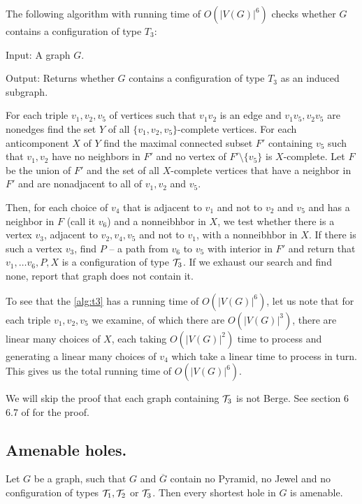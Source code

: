 The following algorithm with running time of $O(|V(G)|^6)$ checks whether $G$ contains a configuration of type $T_3$:

\begin{alg}
	\label{alg:t3}
	Input: A graph $G$.

	\noindent Output: Returns whether $G$ contains a configuration of type $T_3$ as an induced subgraph.
\end{alg}
\begin{algtext2}

	For each triple $v_1, v_2, v_5$ of vertices such that $v_1v_2$ is an edge and $v_1v_5, v_2v_5$ are nonedges find the set $Y$ of all $\{v_1, v_2, v_5\}$-complete vertices. For each anticomponent $X$ of $Y$ find the maximal connected subset $F'$ containing $v_5$ such that $v_1, v_2$ have no neighbors in $F'$ and no vertex of $F'\setminus\{v_5\}$ is $X$-complete. Let $F$ be the union of $F'$ and the set of all $X$-complete vertices that have a neighbor in $F'$ and are nonadjacent to all of $v_1, v_2$ and $v_5$.

	Then, for each choice of $v_4$ that is adjacent to $v_1$ and not to $v_2$ and $v_5$ and has a neighbor in $F$ (call it $v_6$) and a nonneibhbor in $X$, we test whether there is a vertex $v_3$, adjacent to $v_2, v_4, v_5$ and not to $v_1$, with a nonneibhbor in $X$. If there is such a vertex $v_3$, find $P$ -- a path from $v_6$ to $v_5$ with interior in $F'$ and return that $v_1, \ldots v_6, P, X$ is a configuration of type $\mathcal{T}_3$. If we exhaust our search and find none, report that graph does not contain it.
\end{algtext2}

To see that the \cref{alg:t3} has a running time of $O(|V(G)|^6)$, let us note that for each triple $v_1, v_2, v_5$ we examine, of which there are $O(|V(G)|^3)$, there are linear many choices of $X$, each taking $O(|V(G)|^2)$ time to process and generating a linear many choices of $v_4$ which take a linear time to process in turn. This gives us the total running time of $O(|V(G)|^6)$.

We will skip the proof that each graph containing $\mathcal{T}_3$ is not Berge. See section 6 6.7 of \cite{MC05} for the proof.

\subsection{Amenable holes.}
\label{AmenableHoles}

\begin{theorem}
	\label{thm:amenableHoles}
	Let $G$ be a graph, such that $G$ and $\overline{G}$ contain no Pyramid, no Jewel and no configuration of types $\mathcal{T}_1, \mathcal{T}_2$ or $\mathcal{T}_3$. Then every shortest hole in $G$ is amenable.
\end{theorem}

